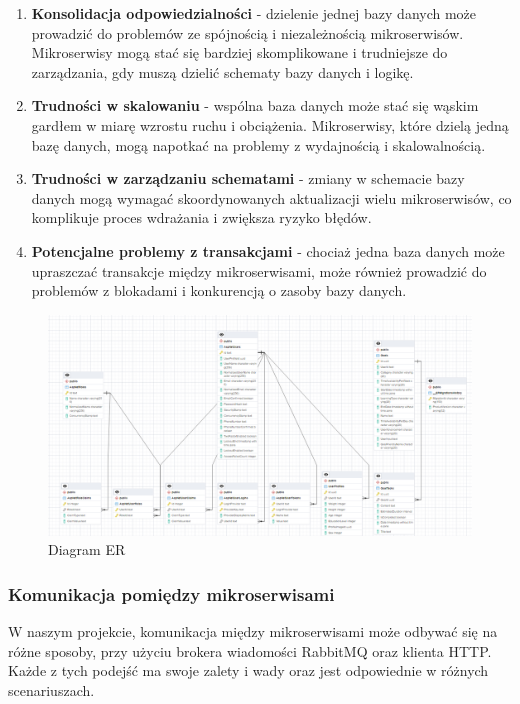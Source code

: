 \begin{enumerate}
\item {\bf Konsolidacja odpowiedzialności} - dzielenie jednej bazy danych może prowadzić do problemów ze spójnością i niezależnością mikroserwisów. Mikroserwisy mogą stać się bardziej skomplikowane i trudniejsze do zarządzania, gdy muszą dzielić schematy bazy danych i logikę.
\item {\bf Trudności w skalowaniu} - wspólna baza danych może stać się wąskim gardłem w miarę wzrostu ruchu i obciążenia. Mikroserwisy, które dzielą jedną bazę danych, mogą napotkać na problemy z wydajnością i skalowalnością.
\item {\bf Trudności w zarządzaniu schematami} - zmiany w schemacie bazy danych mogą wymagać skoordynowanych aktualizacji wielu mikroserwisów, co komplikuje proces wdrażania i zwiększa ryzyko błędów.
\item {\bf Potencjalne problemy z transakcjami} - chociaż jedna baza danych może upraszczać transakcje między mikroserwisami, może również prowadzić do problemów z blokadami i konkurencją o zasoby bazy danych.
\end{enumerate}

\begin{figure}[H]
    \centering
    \includegraphics[width=1\linewidth]{Obrazy/erBazyDanych.png}
    \caption{Diagram ER}
    \label{fig:enter-label}
\end{figure}

\subsubsection{Komunikacja pomiędzy mikroserwisami}
W naszym projekcie, komunikacja między mikroserwisami może odbywać się na różne sposoby, przy użyciu brokera wiadomości RabbitMQ oraz klienta HTTP. Każde z tych podejść ma swoje zalety i wady oraz jest odpowiednie w różnych scenariuszach.


